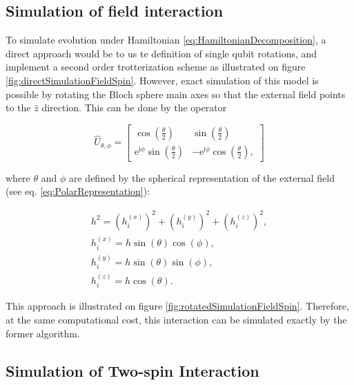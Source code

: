   \subsection{Simulation of field interaction}
  \label{subsec:fieldInteractionCircuit}

    To simulate evolution under Hamiltonian \ref{eq:HamiltonianDecomposition}, a direct approach would be to us te definition of single qubit rotations, and implement a second order trotterization scheme as illustrated on figure \ref{fig:directSimulationFieldSpin}. However, exact simulation of this model is possible by rotating the Bloch sphere main axes so that the external field points to the $\hat{z}$ direction. This can be done by the operator

    \begin{equation}
      \hat{U}_{\theta,\phi} = \begin{bmatrix}
        \cos(\frac{\theta}{2}) & \sin(\frac{\theta}{2}) \\
        \mathrm{e}^{\mathrm{i}\phi}\sin(\frac{\theta}{2}) & -\mathrm{e}^{\mathrm{i}\phi}\cos(\frac{\theta}{2}),
      \end{bmatrix}
      \label{eq:UGate}
    \end{equation}

    \noindent where $\theta$ and $\phi$ are defined by the spherical representation of the external field (see eq. \ref{eq:PolarRepresentation}):

    \begin{gather}
      h^2 =  (h_i^{(x)})^2 + (h_i^{(y)})^2 + (h_i^{(z)})^2 ,\\
      h_i^{(x)} = h \sin(\theta)\cos(\phi), \\
      h_i^{(y)} = h \sin(\theta)\sin(\phi), \\
      h_i^{(z)} = h \cos(\theta).
      \label{eq:PolarRepresentation}
    \end{gather}

    This approach is illustrated on figure \ref{fig:rotatedSimulationFieldSpin}. Therefore, at the same computational cost, this interaction can be simulated exactly by the former algorithm.

    

  \subsection{Simulation of Two-spin Interaction}
  \label{subsec:TwoSpinCircuits}

